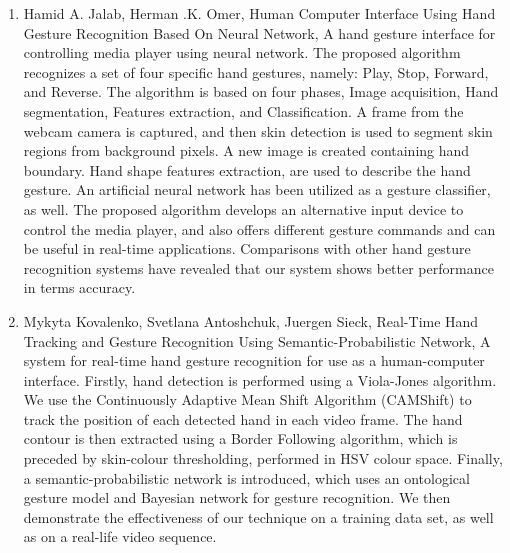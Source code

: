 \documentclass[11pt]{report}
\begin{document}
\begin{enumerate}
    \item Hamid A. Jalab, Herman .K. Omer, Human Computer Interface Using Hand Gesture Recognition Based On Neural Network, A hand gesture interface for controlling media player using neural network. The proposed algorithm recognizes a set of four specific hand gestures, namely: Play, Stop, Forward, and Reverse. The algorithm is based on four phases, Image acquisition, Hand segmentation, Features extraction, and Classification. A frame from the webcam camera is captured, and then skin detection is used to segment skin regions from background pixels. A new image is created containing hand boundary. Hand shape features extraction, are used to describe the hand gesture. An artificial neural network has been utilized as a gesture classifier, as well. The proposed algorithm develops an alternative input device to control the media player, and also offers different gesture commands and can be useful in real-time applications. Comparisons with other hand gesture recognition systems have revealed that our system shows better performance in terms accuracy.
    
    \item Mykyta Kovalenko, Svetlana Antoshchuk, Juergen Sieck, Real-Time Hand Tracking and Gesture Recognition Using Semantic-Probabilistic Network, A system for real-time hand gesture  recognition  for use  as  a  human-computer  interface.  Firstly,   hand   detection   is   performed   using   a   Viola-Jones   algorithm.  We  use  the  Continuously  Adaptive  Mean  Shift  Algorithm  (CAMShift)  to  track  the  position  of  each  detected  hand  in  each  video  frame.  The  hand  contour  is  then  extracted  using  a  Border  Following  algorithm,  which  is  preceded  by  skin-colour   thresholding, performed   in   HSV   colour   space.   Finally,  a  semantic-probabilistic  network  is  introduced,  which  uses  an  ontological  gesture  model  and  Bayesian  network  for  gesture  recognition.  We  then  demonstrate  the  effectiveness  of  our  technique  on  a  training  data  set,  as  well  as  on a  real-life video sequence.
    

\end{enumerate}
\end{document}
